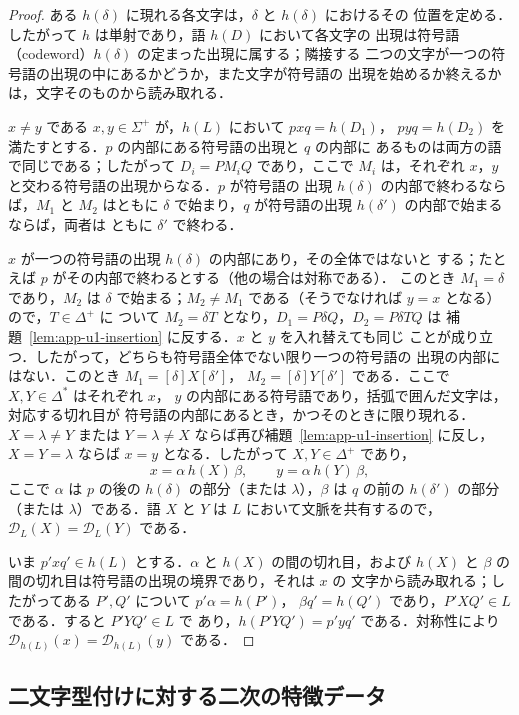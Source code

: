 \documentclass[11pt,a4paper]{ltjsarticle}
\numberwithin{equation}{section}
\theoremstyle{plain}
\theoremstyle{definition}
\theoremstyle{remark}
\theoremstyle{plain}
\newcommand{\D}{\mathcal{D}}
\newcommand{\eps}{\lambda}
\begin{document}
\begin{proof}
ある $h(\delta)$ に現れる各文字は，$\delta$ と $h(\delta)$ におけるその
位置を定める．したがって $h$ は単射であり，語 $h(D)$ において各文字の
出現は符号語（codeword）$h(\delta)$ の定まった出現に属する；隣接する
二つの文字が一つの符号語の出現の中にあるかどうか，また文字が符号語の
出現を始めるか終えるかは，文字そのものから読み取れる．

$x\ne y$ である $x,y\in\Sigma^+$ が，$h(L)$ において $pxq=h(D_1)$，
$pyq=h(D_2)$ を満たすとする．$p$ の内部にある符号語の出現と $q$ の内部に
あるものは両方の語で同じである；したがって $D_i=PM_iQ$ であり，ここで
$M_i$ は，それぞれ $x$，$y$ と交わる符号語の出現からなる．$p$ が符号語の
出現 $h(\delta)$ の内部で終わるならば，$M_1$ と $M_2$ はともに $\delta$
で始まり，$q$ が符号語の出現 $h(\delta')$ の内部で始まるならば，両者は
ともに $\delta'$ で終わる．

$x$ が一つの符号語の出現 $h(\delta)$ の内部にあり，その全体ではないと
する；たとえば $p$ がその内部で終わるとする（他の場合は対称である）．
このとき $M_1=\delta$ であり，$M_2$ は $\delta$ で始まる；$M_2\ne M_1$ である（そうでなければ $y=x$ となる）
ので，$T\in\Delta^+$ に
ついて $M_2=\delta T$ となり，$D_1=P\delta Q$，$D_2=P\delta TQ$ は
補題~\ref{lem:app-u1-insertion} に反する．$x$ と $y$ を入れ替えても同じ
ことが成り立つ．したがって，どちらも符号語全体でない限り一つの符号語の
出現の内部にはない．このとき $M_1=[\delta]X[\delta']$，
$M_2=[\delta]Y[\delta']$ である．ここで $X,Y\in\Delta^*$ はそれぞれ $x$，
$y$ の内部にある符号語であり，括弧で囲んだ文字は，対応する切れ目が
符号語の内部にあるとき，かつそのときに限り現れる．$X=\eps\ne Y$ または
$Y=\eps\ne X$ ならば再び補題~\ref{lem:app-u1-insertion} に反し，
$X=Y=\eps$ ならば $x=y$ となる．したがって $X,Y\in\Delta^+$ であり，
\[
 x=\alpha\,h(X)\,\beta,\qquad y=\alpha\,h(Y)\,\beta,
\]
ここで $\alpha$ は $p$ の後の $h(\delta)$ の部分（または $\eps$），$\beta$
は $q$ の前の $h(\delta')$ の部分（または $\eps$）である．語 $X$ と $Y$
は $L$ において文脈を共有するので，$\D_L(X)=\D_L(Y)$ である．

いま $p'xq'\in h(L)$ とする．$\alpha$ と $h(X)$ の間の切れ目，および
$h(X)$ と $\beta$ の間の切れ目は符号語の出現の境界であり，それは $x$ の
文字から読み取れる；したがってある $P',Q'$ について $p'\alpha=h(P')$，
$\beta q'=h(Q')$ であり，$P'XQ'\in L$ である．すると $P'YQ'\in L$ で
あり，$h(P'YQ')=p'yq'$ である．対称性により
$\D_{h(L)}(x)=\D_{h(L)}(y)$ である．
\end{proof}

\subsection{二文字型付けに対する二次の特徴データ}
\end{document}
